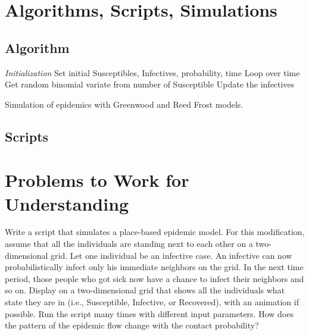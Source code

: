 \documentclass[12pt]{article}
\begin{document}
\hr

\section*{Algorithms, Scripts, Simulations}

\subsection*{Algorithm}

\begin{algorithm}[H]
  \DontPrintSemicolon
  \BlankLine
  \emph{Initialization}\;
  Set initial Susceptibles, Infectives, probability, time\;
  Loop over time\;
  Get random binomial variate from number of Susceptible\;
  Update the infectives\;
  \caption{Simulation of epidemics with Greenwood and Reed Frost models.}
\end{algorithm}

\subsection*{Scripts}



\hr

\section*{Problems to Work for Understanding}
\renewcommand{\theexerciseseries}{}
\renewcommand{\theexercise}{\arabic{exercise}}

\begin{exercise}
    Write a script that simulates a place-based epidemic model.  For
    this modification, assume that all the individuals are standing next
    to each other on a two-dimensional grid.  Let one individual be an
    infective case.  An infective can now probabilistically infect only
    his immediate neighbors on the grid.  In the next time period, those
    people who got sick now have a chance to infect their neighbors and
    so on.  Display on a two-dimensional grid that shows all the
    individuals what state they are in (i.e., Susceptible, Infective, or
    Recovered), with an animation if possible.  Run the script many
    times with different input parameters.  How does the pattern of the
    epidemic flow change with the contact probability?
\end{exercise}
\end{document}
